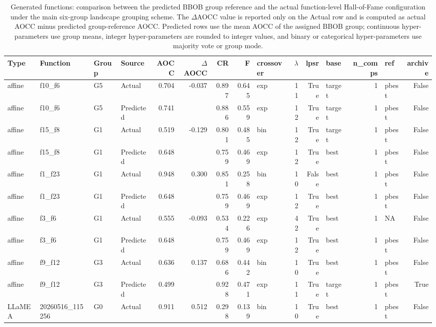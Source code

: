 \begin{table}[htbp]
\centering
\small
\setlength{\tabcolsep}{2.5pt}
\caption{Generated functions: comparison between the predicted BBOB group reference and the actual function-level Hall-of-Fame configuration under the main six-group landscape grouping scheme. The $\Delta$AOCC value is reported only on the Actual row and is computed as actual AOCC minus predicted group-reference AOCC. Predicted rows use the mean AOCC of the assigned BBOB group; continuous hyper-parameters use group means, integer hyper-parameters are rounded to integer values, and binary or categorical hyper-parameters use majority vote or group mode.}
\label{tab:generated-predicted-actual-hof-wide-0307}
\begin{tabular}{llllrrrrlrrlrlr}
\toprule
Type & Function & Group & Source & AOCC & $\Delta$AOCC & CR & F & crossover & $\lambda$ & lpsr & base & n_comps & ref & archive \\
\midrule
affine & f10\_f6 & G5 & Actual & 0.704 & -0.037 & 0.897 & 0.645 & exp & 11 & True & target & 1 & pbest & False \\
affine & f10\_f6 & G5 & Predicted & 0.741 &  & 0.886 & 0.559 & exp & 12 & True & target & 1 & pbest & False \\
\midrule
affine & f15\_f8 & G1 & Actual & 0.519 & -0.129 & 0.801 & 0.485 & bin & 12 & True & target & 1 & pbest & False \\
affine & f15\_f8 & G1 & Predicted & 0.648 &  & 0.759 & 0.469 & exp & 12 & True & best & 1 & pbest & False \\
\midrule
affine & f1\_f23 & G1 & Actual & 0.948 & 0.300 & 0.851 & 0.258 & bin & 10 & False & best & 1 & pbest & False \\
affine & f1\_f23 & G1 & Predicted & 0.648 &  & 0.759 & 0.469 & exp & 12 & True & best & 1 & pbest & False \\
\midrule
affine & f3\_f6 & G1 & Actual & 0.555 & -0.093 & 0.534 & 0.226 & exp & 42 & True & best & 1 & NA & False \\
affine & f3\_f6 & G1 & Predicted & 0.648 &  & 0.759 & 0.469 & exp & 12 & True & best & 1 & pbest & False \\
\midrule
affine & f9\_f12 & G3 & Actual & 0.636 & 0.137 & 0.686 & 0.442 & bin & 10 & True & best & 1 & pbest & False \\
affine & f9\_f12 & G3 & Predicted & 0.499 &  & 0.928 & 0.471 & exp & 11 & True & target & 1 & pbest & True \\
\midrule
LLaMEA & 20260516\_115256 & G0 & Actual & 0.911 & 0.512 & 0.298 & 0.139 & bin & 10 & True & best & 1 & pbest & False \\

\end{tabular}
\end{table}
